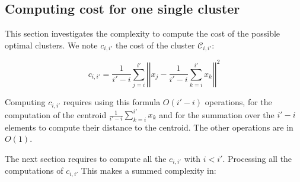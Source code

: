 \documentclass{meta}
\def\CC{{\mathcal{C}}}
\begin{document}
% 
% 
% 
% 
% 
% 
% 
% 
% 
% 
% 

\subsection{Computing cost for one single cluster}\label{sec::singleCluster}

This section investigates the complexity to compute the cost of the possible optimal clusters.
We note $c_{i,i'}$ the cost of the cluster $\CC_{i,i'}$:


$$c_{i,i'} = \frac 1 {i' -i} \sum_{j=i}^{i'} \left|\!\left| x_j - \frac 1 {i' -i} \sum_{k=i}^{i'} x_k \right|\!\right|^2$$

Computing $c_{i,i'}$ requires using this formula $O(i'-i)$ operations, for the computation of the centroid $\frac 1 {i' -i} \sum_{k=i}^{i'} x_k$
and for the summation over the $i'-i$ elements to compute their distance to the centroid.
The other operations are in $O(1)$.

The next section requires to compute  all the $c_{i,i'}$ with $i<i'$. %
Processing all the computations of $c_{i,i'}$ This makes a summed complexity in:
\end{document}
